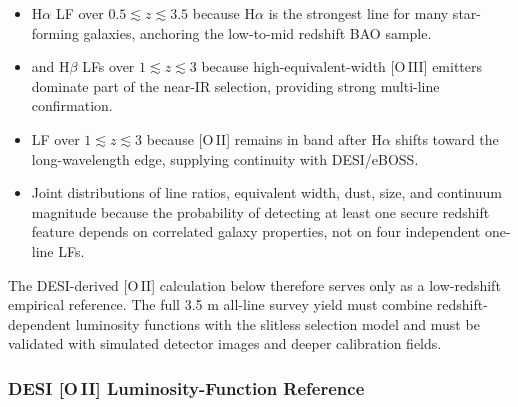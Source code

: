 \begin{itemize}
  \item H$\alpha$ LF over $0.5\lesssim z\lesssim3.5$ because H$\alpha$ is the strongest line for many star-forming galaxies, anchoring the low-to-mid redshift BAO sample.
  \item [O\,III] and H$\beta$ LFs over $1\lesssim z\lesssim3$ because high-equivalent-width [O\,III] emitters dominate part of the near-IR selection, providing strong multi-line confirmation.
  \item [O\,II] LF over $1\lesssim z\lesssim3$ because [O\,II] remains in band after H$\alpha$ shifts toward the long-wavelength edge, supplying continuity with DESI/eBOSS.
  \item Joint distributions of line ratios, equivalent width, dust, size, and continuum magnitude because the probability of detecting at least one secure redshift feature depends on correlated galaxy properties, not on four independent one-line LFs.
\end{itemize}
The DESI-derived [O\,II] calculation below therefore serves only as a low-redshift empirical reference. The full 3.5 m all-line survey yield must combine redshift-dependent luminosity functions with the slitless selection model and must be validated with simulated detector images and deeper calibration fields.

\subsubsection{DESI [O\,II] Luminosity-Function Reference}

